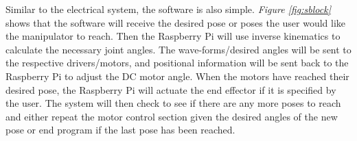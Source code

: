 Similar to the electrical system, the software is also simple. \emph{Figure \ref{fig:sblock}} shows that the software will receive the desired pose or poses the user would like the manipulator to reach. Then the Raspberry Pi will use inverse kinematics to calculate the necessary joint angles. The wave-forms/desired angles will be sent to the respective drivers/motors, and positional information will be sent back to the Raspberry Pi to adjust the DC motor angle. When the motors have reached their desired pose, the Raspberry Pi will actuate the end effector if it is specified by the user. The system will then check to see if there are any more poses to reach and either repeat the motor control section given the desired angles of the new pose or end program if the last pose has been reached.
